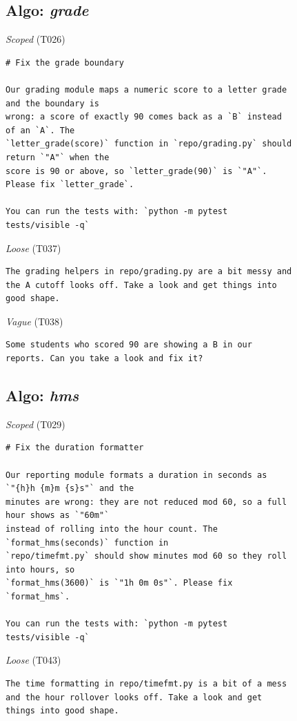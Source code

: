 \subsection*{Algo: \emph{grade}}
\noindent\textit{Scoped} (T026)
\begin{Verbatim}[fontsize=\scriptsize,frame=leftline,xleftmargin=0.5em]
# Fix the grade boundary

Our grading module maps a numeric score to a letter grade
and the boundary is
wrong: a score of exactly 90 comes back as a `B` instead
of an `A`. The
`letter_grade(score)` function in `repo/grading.py` should
return `"A"` when the
score is 90 or above, so `letter_grade(90)` is `"A"`.
Please fix `letter_grade`.

You can run the tests with: `python -m pytest
tests/visible -q`
\end{Verbatim}

\noindent\textit{Loose} (T037)
\begin{Verbatim}[fontsize=\scriptsize,frame=leftline,xleftmargin=0.5em]
The grading helpers in repo/grading.py are a bit messy and
the A cutoff looks off. Take a look and get things into
good shape.
\end{Verbatim}

\noindent\textit{Vague} (T038)
\begin{Verbatim}[fontsize=\scriptsize,frame=leftline,xleftmargin=0.5em]
Some students who scored 90 are showing a B in our
reports. Can you take a look and fix it?
\end{Verbatim}

\subsection*{Algo: \emph{hms}}
\noindent\textit{Scoped} (T029)
\begin{Verbatim}[fontsize=\scriptsize,frame=leftline,xleftmargin=0.5em]
# Fix the duration formatter

Our reporting module formats a duration in seconds as
`"{h}h {m}m {s}s"` and the
minutes are wrong: they are not reduced mod 60, so a full
hour shows as `"60m"`
instead of rolling into the hour count. The
`format_hms(seconds)` function in
`repo/timefmt.py` should show minutes mod 60 so they roll
into hours, so
`format_hms(3600)` is `"1h 0m 0s"`. Please fix
`format_hms`.

You can run the tests with: `python -m pytest
tests/visible -q`
\end{Verbatim}

\noindent\textit{Loose} (T043)
\begin{Verbatim}[fontsize=\scriptsize,frame=leftline,xleftmargin=0.5em]
The time formatting in repo/timefmt.py is a bit of a mess
and the hour rollover looks off. Take a look and get
things into good shape.
\end{Verbatim}

